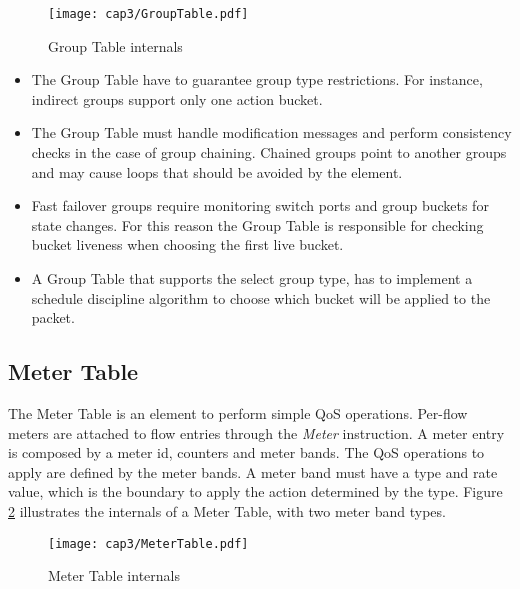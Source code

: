 	\begin{figure}[h!]
    \centering
    \texttt{[image: cap3/GroupTable.pdf]}
    \caption{Group Table internals}
    \label{fig:grouptable}
    \end{figure}

	\begin{itemize}
	
	\item The Group Table have to guarantee group type restrictions. For instance, indirect groups support only one action bucket. 

	\item The Group Table must handle modification messages and perform consistency checks in the case of group chaining. Chained groups point to another groups and may cause loops that should be avoided by the element.  

	\item Fast failover groups require monitoring switch ports and group buckets for state changes. For this reason the Group Table is responsible for checking bucket liveness when choosing the first live bucket.

	\item A Group Table that supports the select group type, has to implement a schedule discipline algorithm to choose which bucket will be applied to the packet.

	\end{itemize}

	\subsection{Meter Table}
	\label{sec:MeterTable}

    The Meter Table is an element to perform simple QoS operations. Per-flow meters are attached to flow entries through the \textit{Meter} instruction. A meter entry is composed by a meter id, counters and meter bands. The QoS operations to apply are defined by the meter bands. A meter band must have a type and rate value, which is the boundary to apply the action determined by the type. Figure \ref{fig:metertable} illustrates the internals of a Meter Table, with two meter band types.   

    \begin{figure}[h!]
    \centering
    \texttt{[image: cap3/MeterTable.pdf]}
    \caption{Meter Table internals}
    \label{fig:metertable}
    \end{figure}

